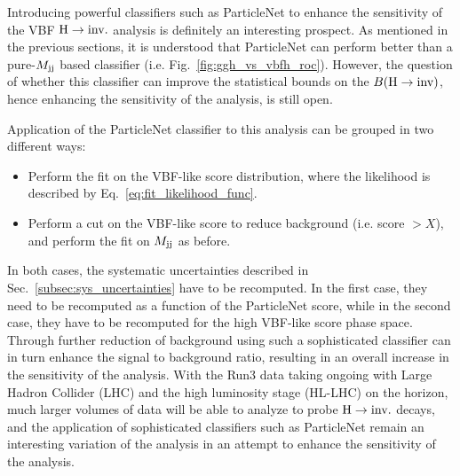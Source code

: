 Introducing powerful classifiers such as ParticleNet to enhance the sensitivity of the VBF $\textrm{H} \rightarrow \textrm{inv.}$ analysis
is definitely an interesting prospect. As mentioned in the previous sections, it is understood that ParticleNet can perform
better than a pure-$M_{\textrm{jj}}$ based classifier (i.e. Fig.~\ref{fig:ggh_vs_vbfh_roc}). However, the question of whether this
classifier can improve the statistical bounds on the ${B(\textrm{H}\rightarrow\text{inv})}$, hence enhancing the sensitivity of the analysis, is still open.

Application of the ParticleNet classifier to this analysis can be grouped in two different ways:

\begin{itemize}
    \item Perform the fit on the VBF-like score distribution, where the likelihood is described by Eq.~\ref{eq:fit_likelihood_func}.
    \item Perform a cut on the VBF-like score to reduce background (i.e. score $> X$), and perform the fit on $M_{\textrm{jj}}$ as before.
\end{itemize}

In both cases, the systematic uncertainties described in Sec.~\ref{subsec:sys_uncertainties} have to be recomputed. In the first case,
they need to be recomputed as a function of the ParticleNet score, while in the second case, they have to be recomputed for the high
VBF-like score phase space. Through further reduction of background using such a sophisticated classifier can in turn enhance the signal
to background ratio, resulting in an overall increase in the sensitivity of the analysis. With the Run3 data taking ongoing with Large
Hadron Collider (LHC) and the high luminosity stage (HL-LHC) on the horizon, much larger volumes of data will be able to analyze to probe
$\textrm{H} \rightarrow \textrm{inv.}$ decays, and the application of sophisticated classifiers such as ParticleNet remain an interesting variation of the analysis in
an attempt to enhance the sensitivity of the analysis.